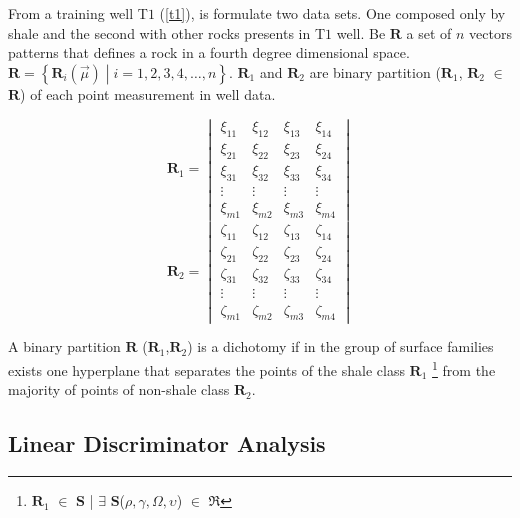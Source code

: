 \documentclass{cilamce19}
\begin{document}
From a training well T$1$ (\ref{t1}), is formulate two data sets. One composed only by shale and the second with other rocks presents in T$1$ well. Be $\textbf{R}$ a set of $n$ vectors patterns that defines a rock in a fourth degree dimensional space. $\textbf{R} = \left\lbrace \textbf{R}_{i}(\vec{\mu}) \middle| i = 1, 2, 3, 4, \dots, n \right\rbrace $. $\textbf{R}_{1}$ and $\textbf{R}_{2}$ are binary partition ($\textbf{R}_{1}$, $\textbf{R}_{2}$ $\in$ $\textbf{R}$) of each point measurement in well data. 

\begin{multicols}{2}
	\begin{equation}
	\textbf{$\textbf{R}_{1}$} =
	\begin{vmatrix} 
	\xi_{11} & \xi_{12} & \xi_{13} & \xi_{14} \\
	\xi_{21} & \xi_{22} & \xi_{23} & \xi_{24} \\
	\xi_{31} & \xi_{32} & \xi_{33} & \xi_{34} \\
	\vdots   & \vdots   & \vdots   & \vdots   \\
	\xi_{m1} & \xi_{m2} & \xi_{m3} & \xi_{m4}
	\end{vmatrix}
	\nonumber
	\end{equation}
	\hspace{100cm}
	\begin{equation}
	\textbf{R}_{2}=
	\begin{vmatrix} 
	\zeta_{11} & \zeta_{12} & \zeta_{13} & \zeta_{14} \\
	\zeta_{21} & \zeta_{22} & \zeta_{23} & \zeta_{24} \\
	\zeta_{31} & \zeta_{32} & \zeta_{33} & \zeta_{34} \\
	\vdots   & \vdots   & \vdots   & \vdots   \\
	\zeta_{m1} & \zeta_{m2} & \zeta_{m3} & \zeta_{m4}
	\end{vmatrix}
	\nonumber
	\end{equation}
\end{multicols}   

A binary partition $\textbf{R}$ ($\textbf{R}_{1}$,$\textbf{R}_{2}$) is a dichotomy if in the group of surface families exists one hyperplane that separates the points of the shale class $\textbf{R}_{1}$ \footnote{$\textbf{R}_{1}$ $\in$ $\textbf{S}$ | $\exists$ $\textbf{S}$($\rho, \gamma, \Omega, \upsilon$) $\in$ $\Re$  } from the majority of points of non-shale class $\textbf{R}_{2}$.


\subsection{Linear Discriminator Analysis}
\end{document}
